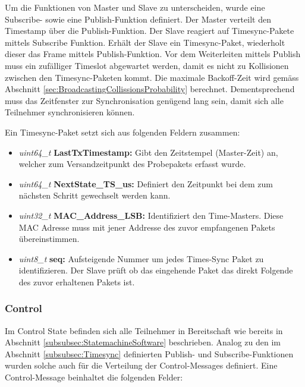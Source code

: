 Um die Funktionen von Master und Slave zu unterscheiden, wurde eine Subscribe- sowie eine Publish-Funktion definiert.
Der Master verteilt den Timestamp über die Publish-Funktion.
Der Slave reagiert auf Timesync-Pakete mittels Subscribe Funktion.
Erhält der Slave ein Timesync-Paket, wiederholt dieser das Frame mittels Publish-Funktion.
Vor dem Weiterleiten mittels Publish muss ein zufälliger Timeslot abgewartet werden, damit es nicht zu Kollisionen zwischen den Timesync-Paketen kommt.
Die maximale Backoff-Zeit wird gemäss Abschnitt \ref{sec:BroadcastingCollissionsProbability} berechnet.
Dementsprechend muss das Zeitfenster zur Synchronisation genügend lang sein, damit sich alle Teilnehmer synchronisieren können.

Ein Timesync-Paket setzt sich aus folgenden Feldern zusammen: 

\begin{itemize}
\item \textit{uint64\_t} \textbf{LastTxTimestamp:}
	Gibt den Zeitstempel (Master-Zeit) an, welcher zum Versandzeitpunkt des Probepakets erfasst wurde.
\item \textit{uint64\_t} \textbf{NextState\_TS\_us:}
	Definiert den Zeitpunkt bei dem zum nächsten Schritt gewechselt werden kann.
\item \textit{uint32\_t} \textbf{MAC\_Address\_LSB:}
	Identifiziert den Time-Masters. Diese MAC Adresse muss mit jener Addresse des zuvor empfangenen Pakets übereinstimmen.
\item \textit{uint8\_t} \textbf{seq:}
	Aufsteigende Nummer um jedes Times-Sync Paket zu identifizieren. Der Slave prüft ob das eingehende Paket das direkt Folgende des zuvor erhaltenen Pakets ist.
\end{itemize}



\subsubsection{Control}\label{subsubsec:Control}
Im Control State befinden sich alle Teilnehmer in Bereitschaft wie bereits in Abschnitt \ref{subsubsec:StatemachineSoftware} beschrieben.
Analog zu den im Abschnitt \ref{subsubsec:Timesync} definierten Publish- und Subscribe-Funktionen wurden solche auch für die Verteilung der Control-Messages definiert.
Eine Control-Message beinhaltet die folgenden Felder:

